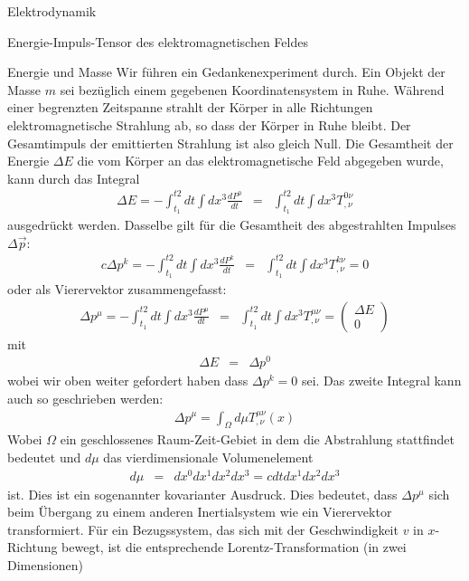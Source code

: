 \begin{chapter}{\titlestr}
\begin{section}{Elektrodynamik}
\begin{subsection}{Energie-Impuls-Tensor des elektromagnetischen Feldes}
\begin{subsubsection}{Energie und Masse}
Wir führen ein Gedankenexperiment durch. Ein Objekt der Masse $m$ sei bezüglich einem gegebenen Koordinatensystem in Ruhe.
Während einer begrenzten Zeitspanne strahlt der Körper in alle Richtungen elektromagnetische Strahlung ab, so dass der Körper in Ruhe bleibt. Der Gesamtimpuls der emittierten Strahlung ist also gleich Null. Die Gesamtheit der Energie $\Delta E$ die vom Körper an das elektromagnetische Feld abgegeben wurde, kann durch das Integral
\begin{eqnarray*}
\Delta E =-\int_{t_1}^{t2} dt\int dx^3 \frac{dP^0}{dt} &=& \int_{t_1}^{t2} dt\int dx^3 T^{0\nu}_{,\nu}
\end{eqnarray*}
ausgedrückt werden. Dasselbe gilt für die Gesamtheit des abgestrahlten Impulses $\Delta\vec{p}$:
\begin{eqnarray*}
c\Delta p^k =-\int_{t_1}^{t2} dt\int dx^3 \frac{dP^k}{dt} &=& \int_{t_1}^{t2} dt\int dx^3 T^{k\nu}_{,\nu}=0
\end{eqnarray*}
oder als Vierervektor zusammengefasst:
\begin{eqnarray*}
\Delta p^\mu =-\int_{t_1}^{t2} dt\int dx^3 \frac{dP^\mu}{dt} &=& \int_{t_1}^{t2} dt\int dx^3 T^{\mu\nu}_{,\nu}
=\begin{pmatrix}
\Delta E\\
0
\end{pmatrix}
\end{eqnarray*}
mit
\begin{eqnarray*}
\Delta E &=& \Delta p^0
\end{eqnarray*}
wobei wir oben weiter gefordert haben dass $\Delta p^k=0$ sei. Das zweite Integral kann auch so geschrieben werden:
\begin{eqnarray*}
\Delta p^\mu = \int_\Omega d\mu T^{\mu\nu}_{,\nu}(x)
\end{eqnarray*}
Wobei $\Omega$ ein geschlossenes Raum-Zeit-Gebiet in dem die Abstrahlung stattfindet bedeutet und $d\mu$ das vierdimensionale Volumenelement
\begin{eqnarray*}
d\mu &=& dx^0dx^1dx^2dx^3 = c dtdx^1dx^2dx^3
\end{eqnarray*}
ist. Dies ist ein sogenannter kovarianter Ausdruck. Dies bedeutet, dass $\Delta p^\mu$ sich beim Übergang zu einem anderen Inertialsystem wie ein Vierervektor transformiert. Für ein Bezugssystem, das sich mit der Geschwindigkeit $v$ in $x$-Richtung bewegt, ist die entsprechende Lorentz-Transformation (in zwei Dimensionen)
\begin{eqnarray*}

\end{eqnarray*}
\end{subsubsection}
\end{subsection}
\end{section}
\end{chapter}

